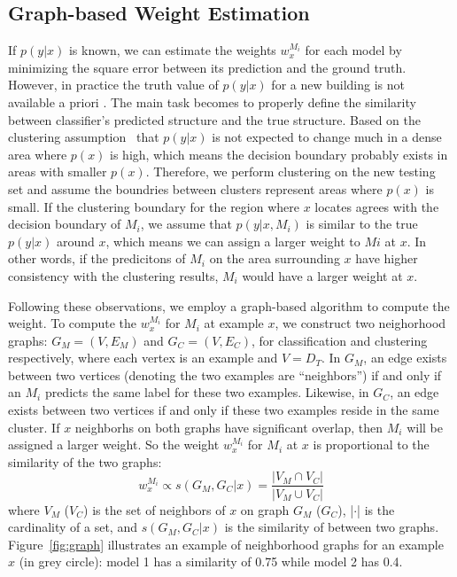 \subsection{Graph-based Weight Estimation}
If $p(y|x)$ is known, we can estimate the weights $w_{x}^{M_i}$ for each model by minimizing the square error between its prediction and the ground truth. 
However, in practice the truth value of $p(y|x)$ for a new building is not available a priori . 
The main task becomes to properly define the similarity between classifier's predicted structure and the true structure. 
Based on the clustering assumption~\cite{cluster} that $p(y|x)$ is not expected
to change much in a dense area where $p(x)$ is high, which means the decision boundary probably exists in areas with smaller $p(x)$.
Therefore, we perform clustering on the new testing set and assume the boundries between clusters represent areas where $p(x)$ is small.
If the clustering boundary for the region where $x$ locates agrees with the decision boundary of $M_i$, we assume that $p(y|x,M_i)$ is similar to the true $p(y|x)$ around $x$, which means we can assign a larger weight to $Mi$ at $x$. 
In other words, if the predicitons of $M_i$ on the area surrounding $x$ have higher consistency with the clustering results, $M_i$ would have a larger weight at $x$. 

Following these observations, we employ a graph-based algorithm to compute the weight.
To compute the $w_{x}^{M_i}$ for $M_i$ at example $x$, we construct two neighorhood graphs: 
$G_M = (V, E_M)$ and $G_C = (V, E_C)$, for classification and clustering respectively, 
where each vertex is an example and $V = D_T$. In $G_M$, an edge exists between two vertices (denoting the two examples are ``neighbors'') if and only if an $M_i$ predicts the same label for these two examples. Likewise, in $G_C$, an edge exists between two vertices if and only if these two examples reside in the same cluster.
If $x$ neighborhs on both graphs have significant overlap, then $M_i$ will be assigned a larger weight.
So the weight $w_{x}^{M_i}$ for $M_i$ at $x$ is proportional to the similarity of the two graphs:
\begin{equation}\label{sim}
w_{x}^{M_i} \propto s(G_M, G_C|x) = \frac {|V_M \cap V_C|} {|V_M \cup V_C|}
\end{equation}
where $V_M$ ($V_C$) is the set of neighbors of $x$ on graph $G_M$ ($G_C$), |$\cdot$| is the cardinality of a set, and $s(G_M, G_C|x)$ is the similarity of between two graphs. 
Figure~\ref{fig:graph} illustrates an example of neighborhood graphs for an example $x$ (in grey circle): model 1 has a similarity of 0.75 while model 2 has 0.4.

